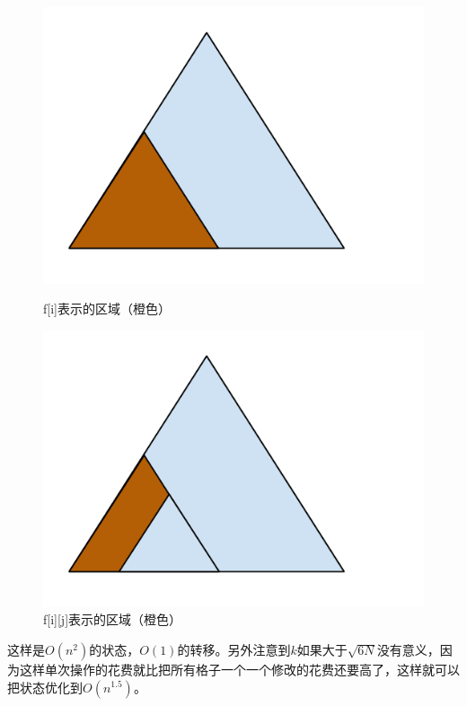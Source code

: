 \documentclass[UTF8]{ctexart}
\theoremstyle{nonumberplain}
\begin{document}
			\begin{figure}[ht]
				\centering
				\begin{minipage}{.45\textwidth}
					\centering
					\includegraphics[width=\textwidth]{fig354d_2.png}
					\caption{f[i]表示的区域（橙色）}
				\end{minipage}
				\begin{minipage}{.45\textwidth}
					\centering
					\includegraphics[width=\textwidth]{fig354d_3.png}
					\caption{f[i][j]表示的区域（橙色）}
				\end{minipage}
			\end{figure}
			
			这样是$O(n^2)$的状态，$O(1)$的转移。另外注意到$k$如果大于$\sqrt{6N}$没有意义，因为这样单次操作的花费就比把所有格子一个一个修改的花费还要高了，这样就可以把状态优化到$O(n^{1.5})$。
			
\end{document}

